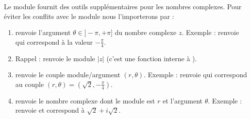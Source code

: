 \documentclass[11pt,class=report,crop=false]{standalone}
\begin{document}
\begin{cours}


Le module  fournit des outils supplémentaires pour les nombres complexes.
Pour éviter les conflits avec le module  nous l'importerons par :


\begin{enumerate}

  \item {} renvoie l'argument $\theta \in ]-\pi,+\pi]$ du nombre complexe $z$.
  Exemple :  renvoie   qui correspond à la valeur $-\frac\pi4$.  
  
  \item Rappel :  renvoie le module $|z|$ (c'est une fonction interne à \Python).
   
  \item {} renvoie le couple module/argument $(r,\theta)$.
  Exemple :  renvoie  qui correspond au couple 
  $(r,\theta) = (\sqrt2,-\frac\pi4)$.
  
  \item {} renvoie le nombre complexe dont le module est $r$ et l'argument $\theta$. Exemple :  renvoie  et correspond à $\sqrt{2}+i\sqrt{2}$.

\end{enumerate}  
\end{cours}

\end{document}
